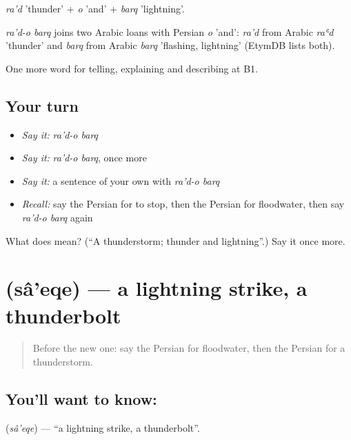 \emph{ra'd} 'thunder' + \emph{o} 'and' + \emph{barq} 'lightning'.

\begin{cousinweb}
\emph{ra'd-o barq} joins two Arabic loans with Persian \emph{o} 'and': \emph{ra'd} from Arabic \emph{raʿd} 'thunder' and \emph{barq} from Arabic \emph{barq} 'flashing, lightning' (EtymDB lists both).
\end{cousinweb}

\begin{grammarlens}[title={What you've built}]
One more word for telling, explaining and describing at B1.
\end{grammarlens}

\subsection*{Your turn}
\begin{itemize}
\raggedright
  \item \emph{Say it:} \emph{ra'd-o barq}
  \item \emph{Say it:} \emph{ra'd-o barq}, once more
  \item \emph{Say it:} a sentence of your own with \emph{ra'd-o barq}
  \item \emph{Recall:} say the Persian for to stop, then the Persian for floodwater, then say \emph{ra'd-o barq} again
\end{itemize}

\begin{tcolorbox}[breakable,colback=teal!4,colframe=teal!35!black,title={Before you move on}]
What does    mean? (\textquotedblleft{}A thunderstorm; thunder and lightning\textquotedblright{}.) Say it once more.
\end{tcolorbox}
\section[\texorpdfstring{\fa{صاعقه} (sâ'eqe)}{صاعقه (sâ'eqe)}]{ (sâ'eqe) — a lightning strike, a thunderbolt}

\label{lesson:FA-C475-saeqe}



\begin{quote}
Before the new one: say the Persian for floodwater, then the Persian for a thunderstorm.
\end{quote}

\subsection*{You'll want to know: }
\textbf{} (\emph{sâ'eqe}) — \textquotedblleft{}a lightning strike, a thunderbolt\textquotedblright{}.

